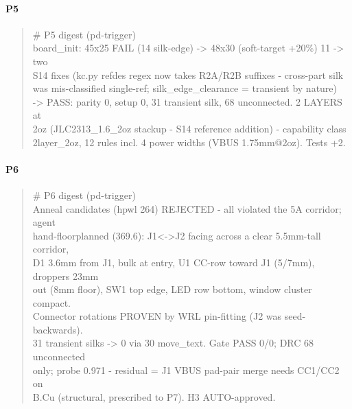 \documentclass[11pt,a4paper]{article}
\begin{document}
\paragraph*{P5}
\begin{quote}\small\ttfamily\raggedright
\# P5 digest (pd-trigger)\\
board\_init: 45x25 FAIL (14 silk-edge) -\textgreater{} 48x30 (soft-target +20\%) 11 -\textgreater{} two\\
S14 fixes (kc.py refdes regex now takes R2A/R2B suffixes - cross-part silk\\
was mis-classified single-ref; silk\_edge\_clearance = transient by nature)\\
-\textgreater{} PASS: parity 0, setup 0, 31 transient silk, 68 unconnected. 2 LAYERS at\\
2oz (JLC2313\_1.6\_2oz stackup - S14 reference addition) - capability class\\
2layer\_2oz, 12 rules incl. 4 power widths (VBUS 1.75mm@2oz). Tests +2.
\end{quote}
\paragraph*{P6}
\begin{quote}\small\ttfamily\raggedright
\# P6 digest (pd-trigger)\\
Anneal candidates (hpwl 264) REJECTED - all violated the 5A corridor; agent\\
hand-floorplanned (369.6): J1\textless{}-\textgreater{}J2 facing across a clear 5.5mm-tall corridor,\\
D1 3.6mm from J1, bulk at entry, U1 CC-row toward J1 (5/7mm), droppers 23mm\\
out (8mm floor), SW1 top edge, LED row bottom, window cluster compact.\\
Connector rotations PROVEN by WRL pin-fitting (J2 was seed-backwards).\\
31 transient silks -\textgreater{} 0 via 30 move\_text. Gate PASS 0/0; DRC 68 unconnected\\
only; probe 0.971 - residual = J1 VBUS pad-pair merge needs CC1/CC2 on\\
B.Cu (structural, prescribed to P7). H3 AUTO-approved.
\end{quote}
\end{document}
